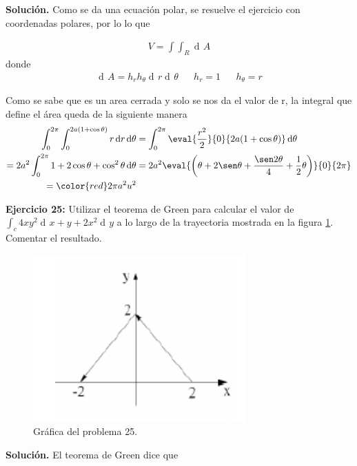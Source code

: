 \documentclass[12pt]{article}
\DeclareMathOperator{\di}{d\!}
\begin{document}
\noindent \textbf{Solución.}
\vspace{3mm}
Como se da una ecuación polar, se resuelve el ejercicio con coordenadas polares, por lo
lo que 

\begin{align*}
	V = \int\int_{R} \di A
\end{align*}
donde
\begin{align*}
	\di A = h_{r}h_{\theta} \di r \di \theta && h_{r}=1 && h_{\theta} = r
\end{align*} 

Como se sabe que es un area cerrada y solo se nos da el valor de r, la integral que define 
el área queda de la siguiente manera
\begin{align*}
	\int_0^{2\pi} \int_0^{2a(1+\cos\theta)} r \di r \di \theta 
	&= \int_0^{2\pi} \eval{\frac{r^2}{2}}{0}{2a(1 + \cos\theta)} \di \theta \\
	=2a^2 \int_0^{2\pi} 1 + 2 \cos\theta + \cos^2\theta \di \theta 
	&= 2a^2 \eval{\left(\theta + 2\sen \theta + \frac{\sen2\theta}{4}
	+ \frac{1}{2} \theta\right)}{0}{2\pi} \\
	= \color{red} 2\pi a^2 u^2  
\end{align*}

\noindent \textbf{Ejercicio 25:}  Utilizar el teorema de Green para calcular el valor de
$\int_c 4xy^2 \di x + y+2x^2 \di y$ a lo largo de la trayectoria mostrada en la figura \ref{ej25}. Comentar el resultado.

\begin{figure}[!htbp] 
	\label{ej25}
	\centering
	\includegraphics[scale = 1]{problema25.png}
	\caption{Gráfica del problema 25.}
\end{figure}

\vspace{5mm}

\noindent \textbf{Solución.}
\vspace{3mm}
El teorema de Green dice que 
\end{document}
